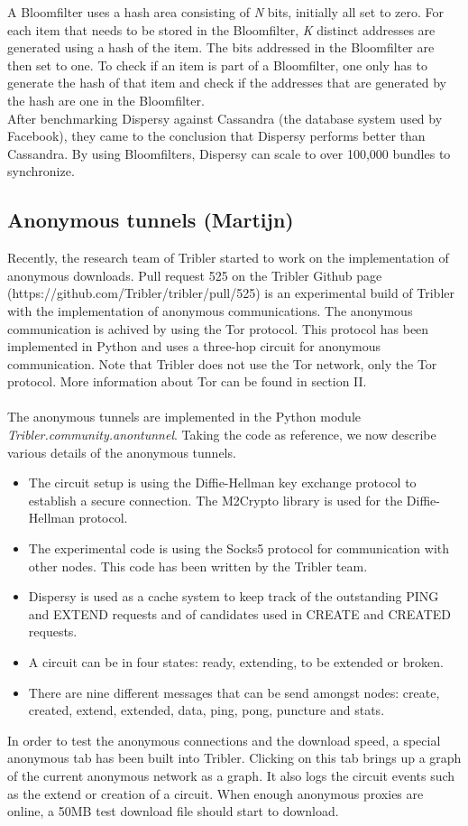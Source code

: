 \documentclass[11pt]{article}
\begin{document}
A Bloomfilter uses a hash area consisting of \emph{N} bits, initially all set to zero. For each item that needs to be stored in the Bloomfilter, \emph{K} distinct addresses are generated using a hash of the item. The bits addressed in the Bloomfilter are then set to one. To check if an item is part of a Bloomfilter, one only has to generate the hash of that item and check if the addresses that are generated by the hash are one in the Bloomfilter.\\

After benchmarking Dispersy against Cassandra (the database system used by Facebook), they came to the conclusion that Dispersy performs better than Cassandra. By using Bloomfilters, Dispersy can scale to over 100,000 bundles to synchronize.

\subsection{Anonymous tunnels (Martijn)}
Recently, the research team of Tribler started to work on the implementation of anonymous downloads. Pull request 525 on the Tribler Github page (https://github.com/Tribler/tribler/pull/525) is an experimental build of Tribler with the implementation of anonymous communications. The anonymous communication is achived by using the Tor protocol. This protocol has been implemented in Python and uses a three-hop circuit for anonymous communication. Note that Tribler does not use the Tor network, only the Tor protocol. More information about Tor can be found in section II.\\\\
The anonymous tunnels are implemented in the Python module \emph{Tribler.community.anontunnel}. Taking the code as reference, we now describe various details of the anonymous tunnels.
\begin{itemize} 
\item The circuit setup is using the Diffie-Hellman key exchange protocol to establish a secure connection. The M2Crypto library is used for the Diffie-Hellman protocol.
\item The experimental code is using the Socks5 protocol for communication with other nodes. This code has been written by the Tribler team.
\item Dispersy is used as a cache system to keep track of the outstanding PING and EXTEND requests and of candidates used in CREATE and CREATED requests.
\item A circuit can be in four states: ready, extending, to be extended or broken.
\item There are nine different messages that can be send amongst nodes: create, created, extend, extended, data, ping, pong, puncture and stats.
\end{itemize}
In order to test the anonymous connections and the download speed, a special anonymous tab has been built into Tribler. Clicking on this tab brings up a graph of the current anonymous network as a graph. It also logs the circuit events such as the extend or creation of a circuit. When enough anonymous proxies are online, a 50MB test download file should start to download.\\\\
\end{document}

